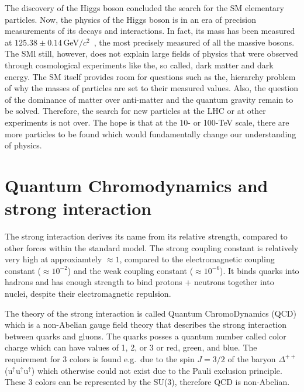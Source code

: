 The discovery of the Higgs boson concluded the search for the SM elementary particles. Now, the physics of the Higgs boson is in an era of precision measurements of its decays and interactions. In fact, its mass has been measured at $125.38\pm0.14\,$GeV$/c^2$~\cite{HiggsMass}, the most precisely measured of all the massive bosons. The SMl still, however, does not explain large fields of physics that were observed through cosmological experiments like the, so called, dark matter and dark energy. The SM itself provides room for questions such as the, hierarchy problem of why the masses of particles are set to their measured values. Also, the question of the dominance of matter over anti-matter and the quantum gravity remain to be solved. Therefore, the search for  new particles at the LHC or at other experiments is not over. The hope is that at the 10- or 100-TeV scale, there are more particles to be found which would fundamentally change our understanding of physics. 





\section{\label{QCD}Quantum Chromodynamics and strong interaction}
The strong interaction derives its name from its relative strength, compared to other forces within the standard model. The strong coupling constant is relatively very high at approxiamtely $\approx 1$, compared to the electromagnetic coupling constant ($\approx 10^{-2}$) and the weak coupling constant ($\approx 10^{-6}$)\@. It binds quarks into hadrons and has enough strength to bind protons + neutrons together into nuclei, despite their electromagnetic repulsion.

The theory of the strong interaction is called Quantum ChromoDynamics (QCD) which is a non-Abelian gauge field theory that describes the strong interaction between quarks and gluons. The quarks posses a quantum number called color charge which can have values of 1, 2, or 3 or red, green, and blue. The requirement for 3 colors is found e.g.\ due to the spin $J = 3/2$ of the baryon $\Delta^{++}$ (u$^\uparrow$u$^\uparrow$u$^\uparrow$) which otherwise could not exist due to the Pauli exclusion principle. These 3 colors can be represented by the SU(3), therefore QCD is non-Abelian.

